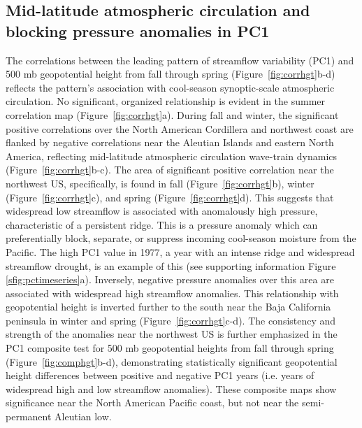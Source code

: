 \documentclass[final, double]{ua-thesis}
\begin{document}
\subsection{Mid-latitude atmospheric circulation and blocking pressure anomalies in PC1}

The correlations between the leading pattern of streamflow variability (PC1) and 500 mb geopotential height from fall through spring (Figure~\ref{fig:corrhgt}b-d) reflects the pattern's association with cool-season synoptic-scale atmospheric circulation. No significant, organized relationship is evident in the summer correlation map (Figure~\ref{fig:corrhgt}a). During fall and winter, the significant positive correlations over the North American Cordillera and northwest coast are flanked by negative correlations near the Aleutian Islands and eastern North America, reflecting mid-latitude atmospheric circulation wave-train dynamics (Figure~\ref{fig:corrhgt}b-c). The area of significant positive correlation near the northwest US, specifically, is found in fall (Figure~\ref{fig:corrhgt}b), winter (Figure~\ref{fig:corrhgt}c), and spring (Figure~\ref{fig:corrhgt}d). This suggests that widespread low streamflow is associated with anomalously high pressure, characteristic of a persistent ridge. This is a pressure anomaly which can preferentially block, separate, or suppress incoming cool-season moisture from the Pacific. The high PC1 value in 1977, a year with an intense ridge and widespread streamflow drought, is an example of this (see supporting information Figure \ref{sfig:pctimeseries}a). Inversely, negative pressure anomalies over this area are associated with widespread high streamflow anomalies. This relationship with geopotential height is inverted further to the south near the Baja California peninsula in winter and spring (Figure~\ref{fig:corrhgt}c-d). The consistency and strength of the anomalies near the northwest US is further emphasized in the PC1 composite test for 500 mb geopotential heights from fall through spring (Figure~\ref{fig:comphgt}b-d), demonstrating statistically significant geopotential height differences between positive and negative PC1 years (i.e. years of widespread high and low streamflow anomalies). These composite maps show significance near the North American Pacific coast, but not near the semi-permanent Aleutian low.
\end{document}
